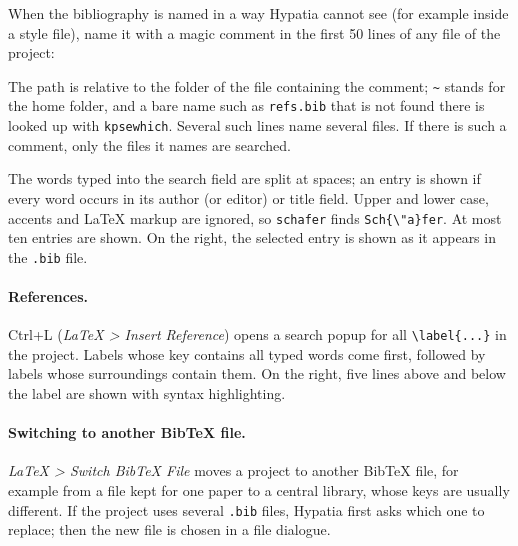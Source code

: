 \documentclass[11pt]{article}
\newcommand{\key}[1]{\textsf{#1}}
\newcommand{\menu}[1]{\textsf{\textit{#1}}}
\begin{document}
    When the bibliography is named in a way Hypatia cannot see (for example inside a style file), name it with a magic comment in the first 50 lines of any file of the project:
    \begin{Code}
    \end{Code}
    The path is relative to the folder of the file containing the comment; \verb+~+ stands for the home folder, and a bare name such as \verb+refs.bib+ that is not found there is looked up with \verb+kpsewhich+. Several such lines name several files. If there is such a comment, only the files it names are searched.

    The words typed into the search field are split at spaces; an entry is shown if every word occurs in its author (or editor) or title field. Upper and lower case, accents and LaTeX markup are ignored, so \verb+schafer+ finds \verb+Sch{\"a}fer+. At most ten entries are shown. On the right, the selected entry is shown as it appears in the \verb+.bib+ file.

    \paragraph{References.}     \key{Ctrl+L} (\menu{LaTeX > Insert Reference}) opens a search popup for all \verb+\label{...}+ in the project. Labels whose key contains all typed words come first, followed by labels whose surroundings contain them. On the right, five lines above and below the label are shown with syntax highlighting.

    \paragraph{Switching to another BibTeX file.}     \menu{LaTeX > Switch BibTeX File} moves a project to another BibTeX file, for example from a file kept for one paper to a central library, whose keys are usually different. If the project uses several \verb+.bib+ files, Hypatia first asks which one to replace; then the new file is chosen in a file dialogue.
\end{document}
